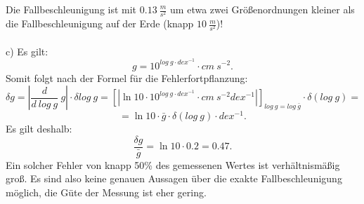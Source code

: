 \documentclass[titlepage]{scrartcl}
\begin{document}
Die Fallbeschleunigung ist mit $ 0.13\ \frac{m}{s^2} $ um etwa zwei Größenordnungen kleiner als die Fallbeschleunigung auf der Erde (knapp $ 10\ \frac{m}{s^2} $)! \\ \\
c) Es gilt:  
\begin{equation}
g = 10^{log\ g\cdot dex^{-1}} \cdot cm\ s ^{-2}.
\nonumber
\end{equation} 
Somit folgt nach der Formel für die Fehlerfortpflanzung: 
\begin{equation}
\delta g = |\frac{d}{d\ log\ g}\ g| \cdot \delta log\ g = [|\ln 10 \cdot 10^{log\ g\cdot dex^{-1}} \cdot cm\ s ^{-2} dex^{-1}|]_{log\ g = log\ \bar{g}} \cdot \delta (log\ g)= 
\nonumber
\end{equation}
\begin{equation}
= \ln 10 \cdot \bar{g} \cdot \delta (log\ g) \cdot dex^{-1}. 
\nonumber
\end{equation}
Es gilt deshalb: 
\begin{equation}
\frac{\delta g}{\bar{g}} = \ln 10 \cdot 0.2 = 0.47.  
\end{equation}
Ein solcher Fehler von knapp 50\% des gemessenen Wertes ist verhältnismäßig groß. Es sind also keine genauen Aussagen über die exakte Fallbeschleunigung möglich, die Güte der Messung ist eher gering. 
\end{document}

